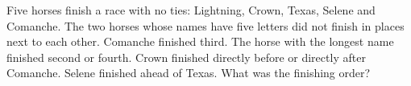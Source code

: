 Five horses finish a race with no ties: Lightning, Crown, Texas, Selene and Comanche. The two horses whose names have five letters did not finish in places next to each other. Comanche finished third. The horse with the longest name finished second or fourth. Crown finished directly before or directly after Comanche. Selene finished ahead of Texas. What was the finishing order?
